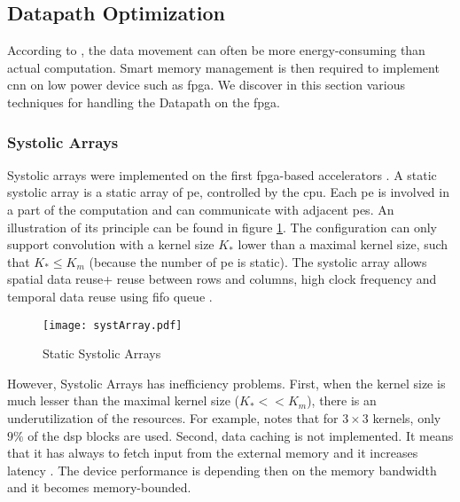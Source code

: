 \subsection{Datapath Optimization} \label{subsec:dtptopti}
According to \textcite{chen_eyeriss_2017}, the data movement can often be more energy-consuming than actual computation. Smart memory management is then required to implement \acrshort{cnn} on low power device such as \acrshort{fpga}. We discover in this section various techniques for handling the Datapath on the \acrshort{fpga}.
%
%
\subsubsection{Systolic Arrays}
%
%
Systolic arrays were implemented on the first \acrshort{fpga}-based accelerators \cite{farabet_cnp_2009, gokhale_240_2014}. A static systolic array is a static array of \acrshort{pe}, controlled by the \acrshort{cpu}. Each \acrshort{pe} is involved in a part of the computation and can communicate with adjacent \acrshort{pe}s. An illustration of its principle can be found in figure \ref{fig:sytar}. The configuration can only support convolution with a kernel size $K_*$ lower than a maximal kernel size, such that $K_* \leq K_m$ (because the number of \acrshort{pe} is static). The systolic array allows spatial data reuse+ reuse between rows and columns, high clock frequency and temporal data reuse using \acrshort{fifo} queue \cite{joos_de_ter_beerst_accelerating_2019, mittal_survey_2020}.
\begin{figure}
    \centering
    \texttt{[image: systArray.pdf]}
    \caption{Static Systolic Arrays}
    \label{fig:sytar}
\end{figure} \newline \newline
However, Systolic Arrays has inefficiency problems. First, when the kernel size is much lesser than the maximal kernel size ($K_* << K_m$), there is an underutilization of the resources. For example, \cite{gokhale_240_2014} notes that for $3 \times 3$ kernels, only $9\%$ of the \acrfull{dsp} blocks are used. Second, data caching is not implemented. It means that it has always to fetch input from the external memory and it increases latency \cite{wei_automated_2017, abdelouahab_accelerating_2018}. The device performance is depending then on the memory bandwidth and it becomes memory-bounded.
%
%
